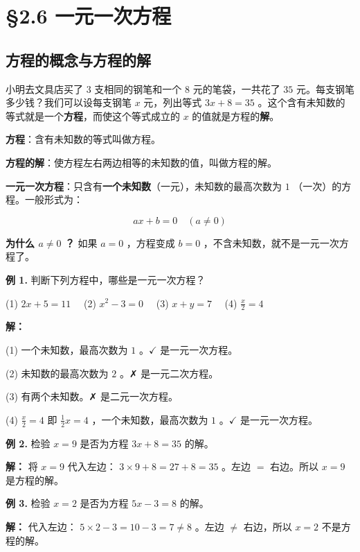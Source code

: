 \chapter{§2.6 一元一次方程}
\label{sec:2.6}





\section*{方程的概念与方程的解}


\begin{explore}


小明去文具店买了 $3$ 支相同的钢笔和一个 $8$ 元的笔袋，一共花了 $35$ 元。每支钢笔多少钱？我们可以设每支钢笔 $x$ 元，列出等式 $3x + 8 = 35$ 。这个含有未知数的等式就是一个\textbf{方程}，而使这个等式成立的 $x$ 的值就是方程的\textbf{解}。

\end{explore}

\begin{understand}


\textbf{方程}：含有未知数的等式叫做方程。

\textbf{方程的解}：使方程左右两边相等的未知数的值，叫做方程的解。

\textbf{一元一次方程}：只含有\textbf{一个未知数}（一元），未知数的最高次数为 \textbf{ $1$ }（一次）的方程。一般形式为：

\[
ax + b = 0 \quad (a \neq 0)
\]


\textbf{为什么 $a \neq 0$ ？} 如果 $a = 0$ ，方程变成 $b = 0$ ，不含未知数，就不是一元一次方程了。

\end{understand}

\begin{workedexamples}


\textbf{例 1.} 判断下列方程中，哪些是一元一次方程？

(1) $2x + 5 = 11$ 　(2) $x^2 - 3 = 0$ 　(3) $x + y = 7$ 　(4) $\frac{x}{2} = 4$

\textbf{解：}

(1) 一个未知数，最高次数为 $1$ 。$\checkmark$ 是一元一次方程。

(2) 未知数的最高次数为 $2$ 。✗ 是一元二次方程。

(3) 有两个未知数。✗ 是二元一次方程。

(4) $\frac{x}{2} = 4$ 即 $\frac{1}{2}x = 4$ ，一个未知数，最高次数为 $1$ 。$\checkmark$ 是一元一次方程。

\textbf{例 2.} 检验 $x = 9$ 是否为方程 $3x + 8 = 35$ 的解。

\textbf{解：} 将 $x = 9$ 代入左边： $3 \times 9 + 8 = 27 + 8 = 35$ 。左边 $=$ 右边。所以 $x = 9$ 是方程的解。

\textbf{例 3.} 检验 $x = 2$ 是否为方程 $5x - 3 = 8$ 的解。

\textbf{解：} 代入左边： $5 \times 2 - 3 = 10 - 3 = 7 \neq 8$ 。左边 $\neq$ 右边，所以 $x = 2$ 不是方程的解。

\end{workedexamples}

